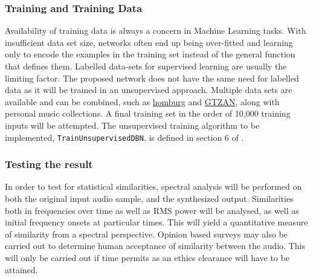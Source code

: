 \documentclass[12pt]{article}
\begin{document}
\subsubsection{Training and Training Data}
Availability of training data is always a concern in Machine Learning tasks. With insufficient data set size, networks often end up being over-fitted and learning only to encode the examples in the training set instead of the general function that defines them. Labelled data-sets for supervised learning are usually the limiting factor. The proposed network does not have the same need for labelled data as it will be trained in an unsupervised approach. Multiple data sets are available and can be combined, such as \href{http://www-ai.cs.uni-dortmund.de/audio.html}{homburg} and \href{http://marsyas.info/downloads/datasets.html}{GTZAN}, along with personal music collections. A final training set in the order of 10,000 training inputs will be attempted. The unsupervised training algorithm to be implemented, \texttt{TrainUnsupervisedDBN}, is defined in section 6 of \citet{bengio2009learning}.

\subsubsection{Testing the result}
In order to test for statistical similarities, spectral analysis will be performed on both the original input audio sample, and the synthesized output. Similarities both in frequencies over time as well as RMS power will be analysed, as well as initial frequency onsets at particular times. This will yield a quantitative measure of similarity from a spectral perspective. Opinion based surveys may also be carried out to determine human acceptance of similarity between the audio. This will only be carried out if time permits as an ethics clearance will have to be attained.
\end{document}
